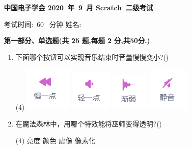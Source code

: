 \documentclass[10pt, a4paper]{article}
\newcommand{\Title}[3]{
    \begin{center}
        \Large \textbf{中国电子学会 #1~年~#2~月 Scratch~#3级考试}
    \end{center}
}
\newcommand{\TimeAndName}[1]{
    \begin{center}
        考试时间:~#1~ 分钟 \qquad\qquad\qquad\qquad 姓名:\underline{\quad\quad\quad\quad}
    \end{center}
}
\begin{document}
    \Title{2020}{9}{二} %
    \TimeAndName{60} %

    \vspace{2mm}
    {\noindent\textbf{第一部分、单选题(共 25 题,每题 2 分,共50分.)}}
    \begin{enumerate}
        \item 下面哪个按钮可以实现音乐结束时音量慢慢变小?(\qquad)
        \begin{tasks}(4)
            \task \includegraphics[width=.04\textwidth]{1a.png}
            \task \includegraphics[width=.04\textwidth]{1b.png}
            \task \includegraphics[width=.04\textwidth]{1c.png}
            \task \includegraphics[width=.04\textwidth]{1d.png}
        \end{tasks}

        \item 在魔法森林中，用哪个特效能将巫师变得透明?(\qquad)
        \begin{tasks}(4)
            \task 亮度
            \task 颜色
            \task 虚像
            \task 像素化
        \end{tasks}


\end{enumerate}
\end{document}
